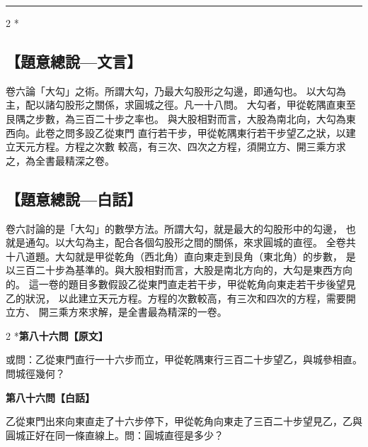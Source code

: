 \documentclass[11pt,a4paper]{article}
\newcommand{\longline}{\noindent\rule{\textwidth}{0.4pt}}
\begin{document}
\vspace{0.3cm}
\longline
\vspace{0.3cm}

\begin{paracol}{2}
\switchcolumn[0]*\subsection*{【題意總說---文言】}
{\small 卷六論「大勾」之術。所謂大勾，乃最大勾股形之勾邊，即通勾也。
以大勾為主，配以諸勾股形之關係，求圓城之徑。凡一十八問。
大勾者，甲從乾隅直東至艮隅之步數，為三百二十步之率也。
與大股相對而言，大股為南北向，大勾為東西向。此卷之問多設乙從東門
直行若干步，甲從乾隅東行若干步望乙之狀，以建立天元方程。方程之次數
較高，有三次、四次之方程，須開立方、開三乘方求之，為全書最精深之卷。}

\switchcolumn\subsection*{【題意總說---白話】}
{\small 卷六討論的是「大勾」的數學方法。所謂大勾，就是最大的勾股形中的勾邊，
也就是通勾。以大勾為主，配合各個勾股形之間的關係，來求圓城的直徑。
全卷共十八道題。大勾就是甲從乾角（西北角）直向東走到艮角（東北角）的步數，
是以三百二十步為基準的。與大股相對而言，大股是南北方向的，大勾是東西方向的。
這一卷的題目多數假設乙從東門直走若干步，甲從乾角向東走若干步後望見乙的狀況，
以此建立天元方程。方程的次數較高，有三次和四次的方程，需要開立方、
開三乘方來求解，是全書最為精深的一卷。}
\end{paracol}

\vspace{0.3cm}

\begin{paracol}{2}
\switchcolumn[0]*\noindent\textbf{第八十六問【原文】}

\small 或問：乙從東門直行一十六步而立，甲從乾隅東行三百二十步望乙，與城參相直。問城徑幾何？

\switchcolumn\noindent\textbf{第八十六問【白話】}

\small 乙從東門出來向東直走了十六步停下，甲從乾角向東走了三百二十步望見乙，乙與圓城正好在同一條直線上。問：圓城直徑是多少？
\end{paracol}

\vspace{0.1cm}
\noindent{}
\par\vspace{0.15cm}
\end{document}
